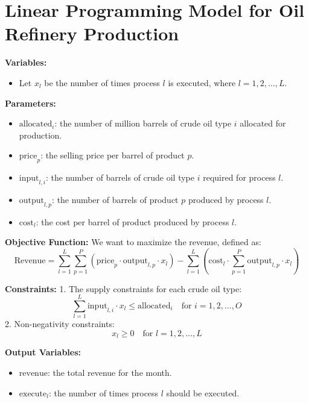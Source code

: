\documentclass{article}
\begin{document}
\section*{Linear Programming Model for Oil Refinery Production}

\textbf{Variables:}
\begin{itemize}
    \item Let \( x_l \) be the number of times process \( l \) is executed, where \( l = 1, 2, \ldots, L \).
\end{itemize}

\textbf{Parameters:}
\begin{itemize}
    \item \( \text{allocated}_i \): the number of million barrels of crude oil type \( i \) allocated for production.
    \item \( \text{price}_p \): the selling price per barrel of product \( p \).
    \item \( \text{input}_{l,i} \): the number of barrels of crude oil type \( i \) required for process \( l \).
    \item \( \text{output}_{l,p} \): the number of barrels of product \( p \) produced by process \( l \).
    \item \( \text{cost}_l \): the cost per barrel of product produced by process \( l \).
\end{itemize}

\textbf{Objective Function:}
We want to maximize the revenue, defined as:
\[
\text{Revenue} = \sum_{l=1}^{L} \sum_{p=1}^{P} \left( \text{price}_p \cdot \text{output}_{l,p} \cdot x_l \right) - \sum_{l=1}^{L} \left( \text{cost}_l \cdot \sum_{p=1}^{P} \text{output}_{l,p} \cdot x_l \right)
\]

\textbf{Constraints:}
1. The supply constraints for each crude oil type:
\[
\sum_{l=1}^{L} \text{input}_{l,i} \cdot x_l \leq \text{allocated}_i \quad \text{for } i = 1, 2, \ldots, O
\]
2. Non-negativity constraints:
\[
x_l \geq 0 \quad \text{for } l = 1, 2, \ldots, L
\]

\textbf{Output Variables:}
\begin{itemize}
    \item \( \text{revenue} \): the total revenue for the month.
    \item \( \text{execute}_l \): the number of times process \( l \) should be executed.
\end{itemize}
\end{document}

